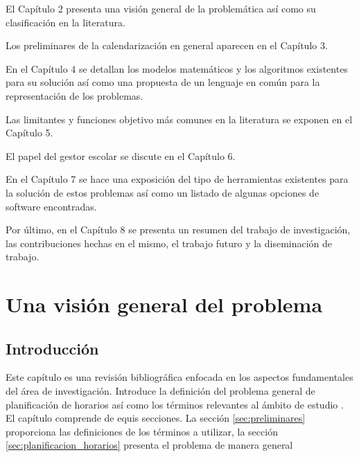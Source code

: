 \documentclass[draft,12pt,headsepline,footsepline,paper=letter]{scrreprt}
\begin{document}
El Capítulo 2 presenta una visión general de la problemática así como su clasificación en la literatura.

Los preliminares de la calendarización en general aparecen en el Capítulo 3.

En el Capítulo 4 se detallan los modelos matemáticos y los algoritmos existentes para su solución así como una propuesta de un lenguaje en común para la representación de los problemas.

Las limitantes y funciones objetivo más comunes en la literatura se exponen en el Capítulo 5.

El papel del gestor escolar se discute en el Capítulo 6.

En el Capítulo 7 se hace una exposición del tipo de herramientas existentes para la solución de estos problemas así como un listado de algunas opciones de software encontradas.

Por último, en el Capítulo 8 se presenta un resumen del trabajo de investigación, las contribuciones hechas en el mismo, el trabajo futuro y la diseminación de trabajo.

\chapter{Una visión general del problema}

\section{Introducción}

Este capítulo es una revisión bibliográfica enfocada en los aspectos fundamentales del área de investigación. Introduce la definición del problema general de planificación de horarios así como los términos relevantes al ámbito de estudio \citep[p.~8]{abdullah06heuristic-approaches}.  
El capítulo comprende de equis secciones. La secci\'on \ref{sec:preliminares} proporciona las definiciones de los t\'erminos a utilizar, la secci\'on \ref{sec:planificacion_horarios} presenta el problema de manera general
\end{document}
